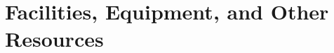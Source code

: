 \documentclass[../preamble.tex]{subfiles}
\begin{document}
	\renewcommand{\thesection}{}
	\section{Facilities, Equipment, and Other Resources}
	
\end{document}
